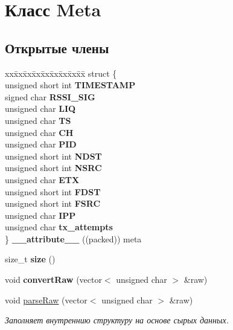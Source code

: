 \hypertarget{classMeta}{}\section{Класс Meta}
\label{classMeta}
\subsection*{Открытые члены}
\begin{DoxyCompactItemize}
\item 
\mbox{\label{classMeta_ac7e6750ca437719e2b190e1fbae1efe2}} 
\begin{tabbing}
xx\=xx\=xx\=xx\=xx\=xx\=xx\=xx\=xx\=\kill
struct \{\\
\>unsigned short int {\bfseries TIMESTAMP}\\
\>signed char {\bfseries RSSI\_SIG}\\
\>unsigned char {\bfseries LIQ}\\
\>unsigned char {\bfseries TS}\\
\>unsigned char {\bfseries CH}\\
\>unsigned char {\bfseries PID}\\
\>unsigned short int {\bfseries NDST}\\
\>unsigned short int {\bfseries NSRC}\\
\>unsigned char {\bfseries ETX}\\
\>unsigned short int {\bfseries FDST}\\
\>unsigned short int {\bfseries FSRC}\\
\>unsigned char {\bfseries IPP}\\
\>unsigned char {\bfseries tx\_attempts}\\
\} {\bfseries \_\_attribute\_\_} ((packed)) meta\\

\end{tabbing}\item 
\mbox{\label{classMeta_a6b4e2e99a1a92eb96ae2554322c50320}} 
size\+\_\+t {\bfseries size} ()
\item 
\mbox{\label{classMeta_a2e94ae8b3cc5a94220d52c1dc42abfb7}} 
void {\bfseries convert\+Raw} (vector$<$ unsigned char $>$ \&raw)
\item 
void \hyperlink{classMeta_a75ca6d184c5d5af3148f7657ba6671e4}{parse\+Raw} (vector$<$ unsigned char $>$ \&raw)
\begin{DoxyCompactList}\small\item\em Заполняет внутреннию структуру на основе сырых данных. \end{DoxyCompactList}\end{DoxyCompactItemize}


